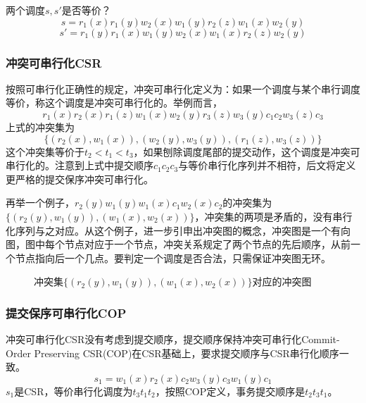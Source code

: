 \begin{exercise}
    两个调度$s, s'$是否等价？
    $$
    s=r_1(x)r_1(y)w_2(x)w_1(y)r_2(z)w_1(x)w_2(y)
    $$
    $$
    s'=r_1(y)r_1(x)w_1(y)w_2(x)w_1(x)r_2(z)w_2(y)
    $$
\end{exercise}

\subsubsection*{冲突可串行化CSR}

按照可串行化正确性的规定，冲突可串行化定义为：如果一个调度与某个串行调度等价，称这个调度是冲突可串行化的。举例而言，
$$
r_1(x)r_2(x)r_1(z)w_1(x)w_2(y)r_3(z)w_3(y)c_1c_2w_3(z)c_3
$$
上式的冲突集为
$$
\{ (r_2(x), w_1(x)), (w_2(y), w_3(y)), (r_1(z),w_3(z))\}
$$
这个冲突集等价于$t_2 < t_1 < t_3$，如果刨除调度尾部的提交动作，这个调度是冲突可串行化的。注意到上式中提交顺序$c_1c_2c_3$与等价串行化序列并不相符，后文将定义更严格的提交保序冲突可串行化。

再举一个例子，$r_2(y)w_1(y)w_1(x)c_1w_2(x)c_2$的冲突集为$\{(r_2(y),w_1(y)),(w_1(x),w_2(x))\}$，冲突集的两项是矛盾的，没有串行化序列与之对应。从这个例子，进一步引申出冲突图的概念，冲突图是一个有向图，图中每个节点对应于一个节点，冲突关系规定了两个节点的先后顺序，从前一个节点指向后一个几点。要判定一个调度是否合法，只需保证冲突图无环。

\begin{figure}[H]
    \centering
    \caption{冲突集$\{(r_2(y),w_1(y)),(w_1(x),w_2(x))\}$对应的冲突图}
    \label{fig:conflict-graph}
\end{figure}

\subsubsection*{提交保序可串行化COP}

冲突可串行化CSR没有考虑到提交顺序，提交顺序保持冲突可串行化Commit-Order Preserving CSR(COP)在CSR基础上，要求提交顺序与CSR串行化顺序一致。
$$
s_1 = w_1(x)r_2(x)c_2w_3(y)c_3w_1(y)c_1
$$
$s_1$是CSR，等价串行化调度为$t_3t_1t_2$，按照COP定义，事务提交顺序是$t_2t_3t_1$。

